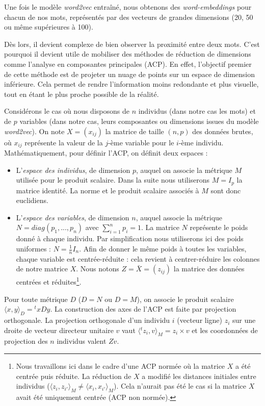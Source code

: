\documentclass[11pt,french,french]{article}
\let\rmarkdownfootnote\footnote%
\def\footnote{\protect\rmarkdownfootnote}
\begin{document}
Une fois le modèle \emph{word2vec} entraîné, nous obtenons des \emph{word-embeddings} pour chacun de nos mots, représentés par des vecteurs de grandes dimensions (20, 50 ou même supérieures à 100).

Dès lors, il devient complexe de bien observer la proximité entre deux mots.
C'est pourquoi il devient utile de mobiliser des méthodes de réduction de dimensions comme l'analyse en composantes principales (ACP).
En effet, l'objectif premier de cette méthode est de projeter un nuage de points sur un espace de dimension inférieure.
Cela permet de rendre l'information moins redondante et plus visuelle, tout en étant le plus proche possible de la réalité.

Considérons le cas où nous disposons de \(n\) individus (dans notre cas les mots) et de \(p\) variables (dans notre cas, leurs composantes ou dimensions issues du modèle \emph{word2vec}).
On note \(X = (x_{ij})\) la matrice de taille \((n,p)\) des données brutes, où \(x_{ij}\) représente la valeur de la \(j\)-ème variable pour le \(i\)-ème individu. Mathématiquement, pour définir l'ACP, on définit deux espaces :

\begin{itemize}
\item
  L'\emph{espace des individus}, de dimension \(p\), auquel on associe la métrique \(M\) utilisée pour le produit scalaire. Dans la suite nous utiliserons \(M =I_p\) la matrice identité. La norme et le produit scalaire associés à \(M\) sont donc euclidiens.
\item
  L'\emph{espace des variables}, de dimension \(n\), auquel associe la métrique \(N=diag(p_1,...,p_n)\) avec \(\sum_{i=1}^np_i=1\). La matrice \(N\) représente le poids donné à chaque individu. Par simplification nous utiliserons ici des poids uniformes : \(N=\frac{1}{n}I_n\). Afin de donner le même poids à toutes les variables, chaque variable est centrée-réduite : cela revient à centrer-réduire les colonnes de notre matrice \(X\). Nous notons \(Z =\bar X= (z_{ij})\) la matrice des données centrées et réduites\footnote{Nous travaillons ici dans le cadre d'une ACP normée où la matrice \(X\) a été centrée puis réduite. La réduction de \(X\) a modifié les distances initiales entre individus (\(\langle z_i,z_{i'}\rangle_M \neq \langle x_i,x_{i'}\rangle_M\)). Cela n'aurait pas été le cas si la matrice \(X\) avait été uniquement centrée (ACP non normée).}.
\end{itemize}

Pour toute métrique \(D\) (\(D=N\) ou \(D=M\)), on associe le produit scalaire \(\langle x,y\rangle_{D} = {}^t\!xD y\).
La construction des axes de l'ACP est faite par projection orthogonale.
La projection orthogonale d'un individu \(i\) (vecteur ligne) \(z_i\) sur une droite de vecteur directeur unitaire \(v\) vaut \(\langle {}^tz_i,v\rangle_{M}=z_i\times v\) et les coordonnées de projection des \(n\) individus valent \(Zv\).
\end{document}
